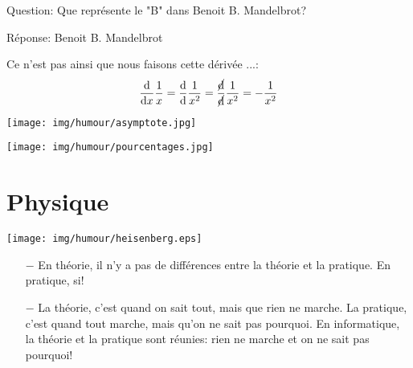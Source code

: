 	Question: Que représente le "B" dans Benoit B. Mandelbrot?

	Réponse: Benoit B. Mandelbrot
	
	\begin{center}\underline{\hspace{5 cm}}\end{center}
	
	Ce n'est pas ainsi que nous faisons cette dérivée ...:
	\begin{gather}
		\dfrac{\mathrm{d}}{\mathrm{d}x}\dfrac{1}{x}=\dfrac{\mathrm{d}}{\mathrm{d}}\dfrac{1}{x^2}=\dfrac{\cancel{\mathrm{d}}}{\cancel{\mathrm{d}}}\dfrac{1}{x^2}=-\dfrac{1}{x^2}
	\end{gather}
	
	\begin{center}\underline{\hspace{5 cm}}\end{center}

	\begin{center}
		\texttt{[image: img/humour/asymptote.jpg]}	
	\end{center}
	
	\begin{center}\underline{\hspace{5 cm}}\end{center}
	
	\begin{center}
		\texttt{[image: img/humour/pourcentages.jpg]}	
	\end{center}

	\pagebreak
	\section{Physique}
	
	\begin{center}
	\texttt{[image: img/humour/heisenberg.eps]}
	\end{center}
	
	\begin{center}\underline{\hspace{5 cm}}\end{center}	
	
	\begin{itemize}	 
		\item[$-$] En théorie, il n'y a pas de différences entre la théorie et la pratique. En pratique, si!
	
		\item[$-$] La théorie, c'est quand on sait tout, mais que rien ne marche. La pratique, c'est quand tout marche, mais qu'on ne sait pas pourquoi. En informatique, la théorie et la pratique sont réunies: rien ne marche et on ne sait pas pourquoi!
	\end{itemize}

